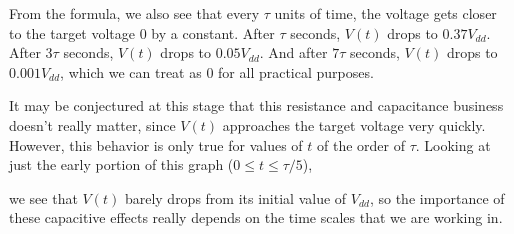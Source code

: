 \documentclass[letterpaper]{article}
\theoremstyle{remark}
\begin{document}
From the formula, we also see that every $\tau$ units of time, the voltage gets closer to the target voltage $0$ by a constant. After $\tau$ seconds, $V(t)$ drops to $0.37 V_{dd}$. After $3\tau$ seconds, $V(t)$ drops to $0.05 V_{dd}$. And after $7\tau$ seconds, $V(t)$ drops to $0.001 V_{dd}$, which we can treat as $0$ for all practical purposes.

It may be conjectured at this stage that this resistance and capacitance business doesn't really matter, since $V(t)$ approaches the target voltage very quickly. However, this behavior is only true for values of $t$ of the order of $\tau$. Looking at just the early portion of this graph ($0 \le t \le \tau / 5$),
\begin{center}
\end{center}
we see that $V(t)$ barely drops from its initial value of $V_{dd}$, so the importance of these capacitive effects really depends on the time scales that we are working in.
\end{document}
